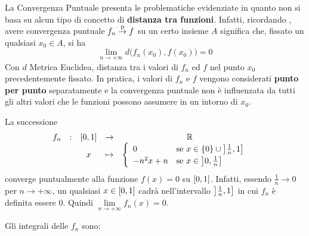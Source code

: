 La Convergenza Puntuale presenta le problematiche evidenziate in quanto non si basa su alcun tipo di concetto di \textbf{distanza tra funzioni}. Infatti, ricordando , avere convergenza puntuale $f_n \overset{\text{p}}{\to} f$ su un certo insieme $A$ significa che, fissato un qualsiasi $x_0 \in A$, si ha
\[\lim\limits_{n \to +\infty} d \bigl( f_n(x_0), f(x_0) \bigr) = 0\]
Con $d$ Metrica Euclidea, distanza tra i valori di $f_n$ ed $f$ nel punto $x_0$ precedentemente fissato. In pratica, i valori di $f_n$ e $f$ vengono considerati \textbf{punto per punto} separatamente e la convergenza puntuale non è influenzata da tutti gli altri valori che le funzioni possono assumere in un intorno di $x_0$.
\begin{example}
	\label{ex:conv_punt_no_pass_lim_integrale}
	La successione
	\[
		\begin{array}{ccccc} {f_n} & : & {\left[0,1\right]} & \to & {\mathbb{R}} \\ & & {x} & \mapsto & {
			\begin{cases}
				\begin{array}{ll}
					0 & \text{se } x \in \left\{0\right\} \cup \left]\frac{1}{n},1\right]\\
					-n^2x + n & \text{se } x \in \left]0,\frac{1}{n}\right]
				\end{array}
			\end{cases}
		} \\ \end{array}
	\]
	converge puntualmente alla funzione $f(x) = 0$ su $\left[0,1\right]$. Infatti, essendo $\frac{1}{n} \to 0$ per $n \to +\infty$, un qualsiasi $x \in \left[0,1\right]$ cadrà nell'intervallo $\left]\frac{1}{n},1\right]$ in cui $f_n$ è definita essere $0$. Quindi $\lim\limits_{n \to +\infty} f_n(x) = 0$.
	\begin{center}
	\end{center}
	Gli integrali delle $f_n$ sono:
	\begin{align*}

\end{align*}
\end{example}
